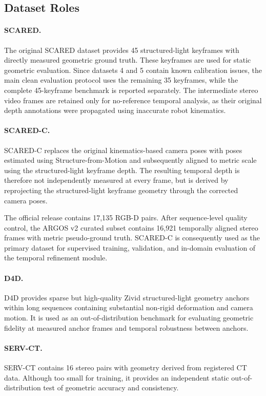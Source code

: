 \documentclass[11pt,a4paper]{article}
\begin{document}
\subsection{Dataset Roles}

\paragraph{SCARED.}
The original SCARED dataset provides 45 structured-light keyframes with directly measured
geometric ground truth. These keyframes are used for static geometric evaluation. Since
datasets 4 and 5 contain known calibration issues, the main clean evaluation protocol uses
the remaining 35 keyframes, while the complete 45-keyframe benchmark is reported separately.
The intermediate stereo video frames are retained only for no-reference temporal analysis,
as their original depth annotations were propagated using inaccurate robot kinematics.

\paragraph{SCARED-C.}
SCARED-C replaces the original kinematics-based camera poses with poses estimated using
Structure-from-Motion and subsequently aligned to metric scale using the structured-light
keyframe depth. The resulting temporal depth is therefore not independently measured at
every frame, but is derived by reprojecting the structured-light keyframe geometry through
the corrected camera poses.

The official release contains 17,135 RGB-D pairs. After sequence-level quality control,
the ARGOS v2 curated subset contains 16,921 temporally aligned stereo frames with metric
pseudo-ground truth. SCARED-C is consequently used as the primary dataset for supervised
training, validation, and in-domain evaluation of the temporal refinement module.

\paragraph{D4D.}
D4D provides sparse but high-quality Zivid structured-light geometry anchors within long
sequences containing substantial non-rigid deformation and camera motion. It is used as an
out-of-distribution benchmark for evaluating geometric fidelity at measured anchor frames
and temporal robustness between anchors.

\paragraph{SERV-CT.}
SERV-CT contains 16 stereo pairs with geometry derived from registered CT data. Although too
small for training, it provides an independent static out-of-distribution test of geometric
accuracy and consistency.
\end{document}
